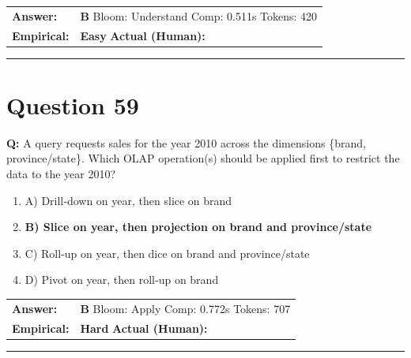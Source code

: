 \documentclass[9pt]{article}
\begin{document}
\begin{tabular}{@{}l p{10.5cm}@{}}
\textbf{Answer:} & \textbf{B} \hspace{1em} Bloom: Understand \hspace{1em} Comp: 0.511s \hspace{1em} Tokens: 420 \\
\textbf{Empirical:} & \textbf{Easy} \hspace{1em} \textbf{Actual (Human):} \underline{\hspace{5cm}}
\end{tabular}

\vspace{0.2cm}
\rule{\textwidth}{0.4pt}
\vspace{0.2cm}


\section*{Question 59}

\textbf{Q:} A query requests sales for the year 2010 across the dimensions \{brand, province/state\}. Which OLAP operation(s) should be applied first to restrict the data to the year 2010?

\begin{enumerate}[label=\textbf{\alph{*})}, nosep]
    \item A) Drill‑down on year, then slice on brand
    \item \textbf{B) Slice on year, then projection on brand and province/state} %
    \item C) Roll‑up on year, then dice on brand and province/state
    \item D) Pivot on year, then roll‑up on brand

\end{enumerate}

\begin{tabular}{@{}l p{10.5cm}@{}}
\textbf{Answer:} & \textbf{B} \hspace{1em} Bloom: Apply \hspace{1em} Comp: 0.772s \hspace{1em} Tokens: 707 \\
\textbf{Empirical:} & \textbf{Hard} \hspace{1em} \textbf{Actual (Human):} \underline{\hspace{5cm}}
\end{tabular}

\vspace{0.2cm}
\rule{\textwidth}{0.4pt}
\vspace{0.2cm}
\end{document}
